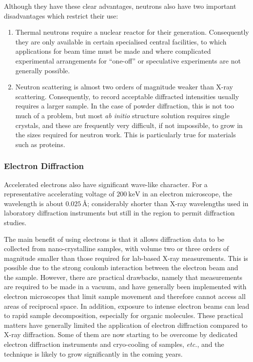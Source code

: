 \documentclass{article}
\theoremstyle{plain}\theoremheaderfont{\normalfont\itshape}\theorembodyfont{\rmfamily}\theoremseparator{.}\newtheorem*{rem}{Remark}\newtheorem*{ex}{Example}\newtheorem*{proof}{Proof}\newtheorem*{altp}{Alternative proof}
\theoremstyle{plain}\theoremheaderfont{\normalfont\bfseries}\theorembodyfont{\rmfamily}\theoremseparator{.}\newtheorem{thm}{Theorem}[section]\newtheorem{lem}[thm]{Lemma}\newtheorem{prop}[thm]{Proposition}\newtheorem*{cor}{Corollary}\newtheorem{defn}[thm]{Definition}\newtheorem{clm}[thm]{Claim}\newtheorem{clminproof}{Claim}\newtheorem*{law}{Law}\newtheorem{pos}[thm]{Postulate}
\theoremstyle{break}\theoremheaderfont{\normalfont\itshape}\theorembodyfont{\rmfamily}\theoremseparator{.\medskip}\newtheorem*{proofskip}{Proof}\newtheorem*{exs}{Examples}\newtheorem*{rems}{Remarks}
\theoremstyle{break}\theoremheaderfont{\normalfont\bfseries}\theorembodyfont{\rmfamily}\theoremseparator{.\medskip}\newtheorem{lemskip}[thm]{Lemma}\newtheorem{defnskip}[thm]{Definition}\newtheorem{propskip}[thm]{Proposition}\newtheorem{thmskip}[thm]{Theorem}
\numberwithin{equation}{section}
\newcommand{\unit}[1]{\ \mathrm{#1}}
\begin{document}
    Although they have these clear advantages, neutrons also have two important disadvantages which restrict their use:
    \begin{enumerate}
        \item Thermal neutrons require a nuclear reactor for their generation. Consequently they are only available in certain specialised central facilities, to which applications for beam time must be made and where complicated experimental arrangements for ``one-off'' or speculative experiments are not generally possible.
        \item Neutron scattering is almost two orders of magnitude weaker than X-ray scattering. Consequently, to record acceptable diffracted intensities usually requires a larger sample. In the case of powder diffraction, this is not too much of a problem, but most \textit{ab initio} structure solution requires single crystals, and these are frequently very difficult, if not impossible, to grow in the sizes required for neutron work. This is particularly true for materials such as proteins. 
    \end{enumerate}

    \subsubsection{Electron Diffraction}
    Accelerated electrons also have significant wave-like character. For a representative accelerating voltage of \(200 \unit{keV}\) in an electron microscope, the wavelength is about \(0.025\,\text{\AA}\); considerably shorter than X-ray wavelengths used in laboratory diffraction instruments but still in the region to permit diffraction studies.

    The main benefit of using electrons is that it allows diffraction data to be collected from nano-crystalline samples, with volume two or three orders of magnitude smaller than those required for lab-based X-ray measurements. This is possible due to the strong coulomb interaction between the electron beam and the sample. However, there are practical drawbacks, namely that measurements are required to be made in a vacuum, and have generally been implemented with electron microscopes that limit sample movement and therefore cannot access all areas of reciprocal space. In addition, exposure to intense electron beams can lead to rapid sample decomposition, especially for organic molecules. These practical matters have generally limited the application of electron diffraction compared to X-ray diffraction. Some of them are now starting to be overcome by dedicated electron diffraction instruments and cryo-cooling of samples, \textit{etc.}, and the technique is likely to grow significantly in the coming years.
\end{document}
